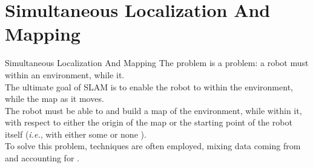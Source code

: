 
\section{Simultaneous Localization And Mapping}
\graphicspath{{figs/section4/}}

\begin{frame}{Simultaneous Localization And Mapping}
  The  problem is a  problem: a robot must  within an environment, while  it.\\
  \bigskip
  The ultimate goal of SLAM is to enable the robot to  within the environment, while  the map as it moves.\\
  \bigskip
  The robot must be able to  and  build a map of the environment, while  within it, with respect to either the origin of the map or the starting point of the robot itself (\emph{i.e.}, with either some or none ).\\
  \bigskip
  To solve this problem,  techniques are often employed, mixing data coming from  and accounting for .
\end{frame}
